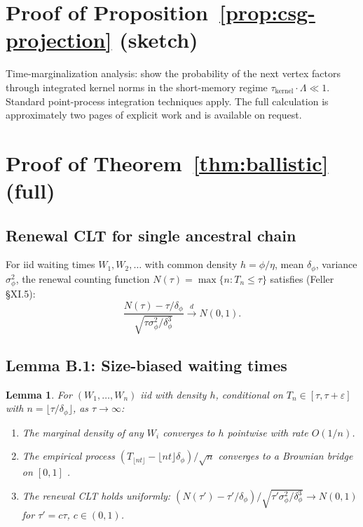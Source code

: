 \documentclass[11pt,a4paper]{article}
\newtheorem{lemma}[theorem]{Lemma}
\begin{document}
\appendix

\section{Proof of Proposition~\ref{prop:csg-projection} (sketch)}
\label{app:csg-proof}

Time-marginalization analysis: show the probability of the next vertex factors through integrated kernel norms in the short-memory regime $\tau_{\mathrm{kernel}} \cdot \Lambda \ll 1$. Standard point-process integration techniques apply. The full calculation is approximately two pages of explicit work and is available on request.

\section{Proof of Theorem~\ref{thm:ballistic} (full)}
\label{app:ballistic-proof}

\subsection{Renewal CLT for single ancestral chain}

For iid waiting times $W_1, W_2, \ldots$ with common density $h = \phi/\eta$, mean $\delta_\phi$, variance $\sigma_\phi^2$, the renewal counting function $N(\tau) = \max\{n: T_n \leq \tau\}$ satisfies (Feller \cite{Feller1971} §XI.5):
\begin{equation}
\frac{N(\tau) - \tau/\delta_\phi}{\sqrt{\tau\sigma_\phi^2/\delta_\phi^3}} \xrightarrow{d} N(0,1).
\end{equation}

\subsection{Lemma B.1: Size-biased waiting times}

\begin{lemma}
For $(W_1, \ldots, W_n)$ iid with density $h$, conditional on $T_n \in [\tau, \tau+\varepsilon]$ with $n = \lfloor\tau/\delta_\phi\rfloor$, as $\tau \to \infty$:
\begin{enumerate}
\item[(i)] The marginal density of any $W_i$ converges to $h$ pointwise with rate $O(1/n)$.
\item[(ii)] The empirical process $(T_{\lfloor nt\rfloor} - \lfloor nt\rfloor\delta_\phi)/\sqrt{n}$ converges to a Brownian bridge on $[0,1]$ \cite{CsorgoHorvath1993}.
\item[(iii)] The renewal CLT holds uniformly: $(N(\tau') - \tau'/\delta_\phi)/\sqrt{\tau'\sigma_\phi^2/\delta_\phi^3} \to N(0,1)$ for $\tau' = c\tau$, $c \in (0,1)$.
\end{enumerate}
\end{lemma}
\end{document}
